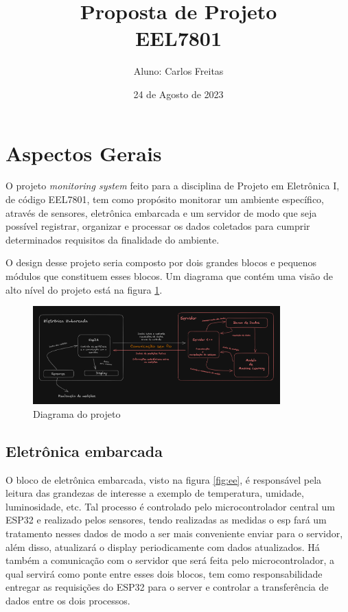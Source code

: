 \documentclass[11pt]{article}
\title{Proposta de Projeto\\ EEL7801}
\author{Aluno: Carlos Freitas}
\date{24 de Agosto de 2023}
\begin{document}
\maketitle

\section*{Aspectos Gerais}

O projeto \textit{monitoring system} feito para a disciplina de
Projeto em Eletrônica I, de código EEL7801, tem como propósito monitorar
um ambiente específico, através de sensores, eletrônica embarcada e um servidor de modo
que seja possível registrar, organizar e processar os dados coletados para
cumprir determinados requisitos da finalidade do ambiente.

O design desse projeto seria composto por dois grandes blocos e pequenos
módulos que constituem esses blocos. Um diagrama que contém uma visão de alto
nível do projeto está na figura \ref{fig:diagram}.

\begin{figure}[h]
	\centering
	\includegraphics[width=0.85\textwidth,keepaspectratio]{diagramaprojetoI.png}
	\caption{Diagrama do projeto}
	\label{fig:diagram}
\end{figure}

\subsection*{Eletrônica embarcada}

O bloco de eletrônica embarcada, visto na figura \ref{fig:ee}, é responsável pela leitura das grandezas de interesse
a exemplo de temperatura, umidade, luminosidade, etc. Tal processo é controlado pelo
microcontrolador central um ESP32 e realizado pelos sensores, tendo realizadas as medidas
o esp fará um tratamento nesses dados de modo a ser mais conveniente enviar para o servidor,
além disso, atualizará o display periodicamente com dados atualizados. Há também a comunicação
com o servidor que será feita pelo microcontrolador, a qual servirá como ponte entre esses dois
blocos, tem como responsabilidade entregar as requisições do ESP32 para o server e controlar a
transferência de dados entre os dois processos.
\end{document}
